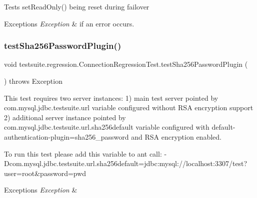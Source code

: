 Tests set\+Read\+Only() being reset during failover


\begin{DoxyExceptions}{Exceptions}
{\em Exception} & if an error occurs. \\
\hline
\end{DoxyExceptions}
\mbox{\label{classtestsuite_1_1regression_1_1_connection_regression_test_a40ea24784903b1b96d51638e255bce89}} 
\subsubsection{\texorpdfstring{test\+Sha256\+Password\+Plugin()}{testSha256PasswordPlugin()}}
{\footnotesize\ttfamily void testsuite.\+regression.\+Connection\+Regression\+Test.\+test\+Sha256\+Password\+Plugin (\begin{DoxyParamCaption}{ }\end{DoxyParamCaption}) throws Exception}

This test requires two server instances\+: 1) main test server pointed by com.\+mysql.\+jdbc.\+testsuite.\+url variable configured without R\+SA encryption support 2) additional server instance pointed by com.\+mysql.\+jdbc.\+testsuite.\+url.\+sha256default variable configured with default-\/authentication-\/plugin=sha256\+\_\+password and R\+SA encryption enabled.

To run this test please add this variable to ant call\+: -\/\+Dcom.\+mysql.\+jdbc.\+testsuite.\+url.\+sha256default=jdbc\+:mysql\+://localhost\+:3307/test?user=root\&password=pwd


\begin{DoxyExceptions}{Exceptions}
{\em Exception} & \\
\hline
\end{DoxyExceptions}
\mbox{\label{classtestsuite_1_1regression_1_1_connection_regression_test_a8a5b38389d6365d90769f30887196749}} 
